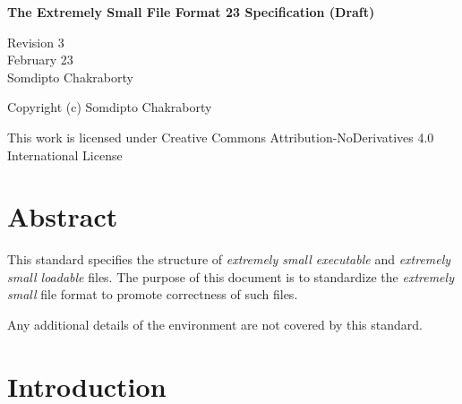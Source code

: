 \documentclass[a4paper]{article}
\begin{document}
    \begin{titlepage}
        \begin{center}
            \vspace*{1cm} %

            \Large{\textbf{The Extremely Small File Format 23 Specification (Draft)}}

            \normalsize

            \vspace*{1.5cm}
            Revision 3 \\
            \vspace*{0.5cm}
            February 23 \\
            \vspace*{0.5cm}
            Somdipto Chakraborty

            \vspace*{7cm}
            Copyright (c) Somdipto Chakraborty

            This work is licensed under Creative Commons Attribution-NoDerivatives 4.0 International License %
        \end{center}
    \end{titlepage}

    \section*{Abstract} 

    This standard specifies the structure of \emph{extremely small executable} and \emph{extremely small loadable} files. The purpose of this document is to standardize the \emph{extremely small} file format to promote correctness of such files.


    Any additional details of the environment are not covered by this standard. 

    \tableofcontents

    \pagebreak

    \section*{Introduction}
\end{document}
